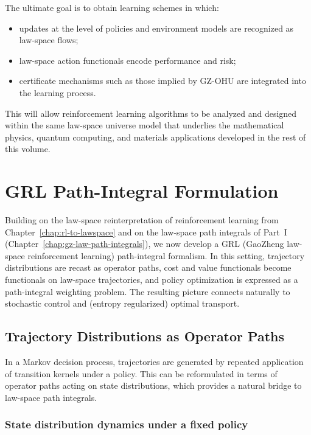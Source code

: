 \documentclass[11pt]{book}
\theoremstyle{plain}
\theoremstyle{definition}
\theoremstyle{remark}
\begin{document}
The ultimate goal is to obtain learning schemes in which:
\begin{itemize}
  \item updates at the level of policies and environment models are
        recognized as law-space flows;
  \item law-space action functionals encode performance and risk;
  \item certificate mechanisms such as those implied by GZ-OHU are
        integrated into the learning process.
\end{itemize}
This will allow reinforcement learning algorithms to be analyzed and
designed within the same law-space universe model that underlies the
mathematical physics, quantum computing, and materials applications
developed in the rest of this volume.



\chapter[GRL Path-Integral Formulation]{GRL Path-Integral Formulation}
\label{chap:grl-path-integral}


Building on the law-space reinterpretation of reinforcement learning
from Chapter~\ref{chap:rl-to-lawspace} and on the law-space path
integrals of Part~I (Chapter~\ref{chap:gz-law-path-integrals}), we
now develop a GRL (GaoZheng law-space reinforcement learning)
path-integral formalism. In this setting, trajectory distributions
are recast as operator paths, cost and value functionals become
functionals on law-space trajectories, and policy optimization is
expressed as a path-integral weighting problem. The resulting
picture connects naturally to stochastic control and (entropy
regularized) optimal transport.

\section{Trajectory Distributions as Operator Paths}
\label{sec:grl-operator-paths}


In a Markov decision process, trajectories are generated by repeated
application of transition kernels under a policy. This can be
reformulated in terms of operator paths acting on state
distributions, which provides a natural bridge to law-space path
integrals.

\subsection*{State distribution dynamics under a fixed policy}
\end{document}
